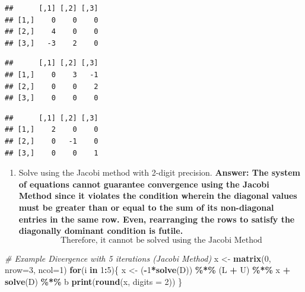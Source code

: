 \documentclass[
]{article}
\newenvironment{Shaded}{\begin{snugshade}}{\end{snugshade}}
\newcommand{\AttributeTok}[1]{\textcolor[rgb]{0.13,0.29,0.53}{#1}}
\newcommand{\CommentTok}[1]{\textcolor[rgb]{0.56,0.35,0.01}{\textit{#1}}}
\newcommand{\ControlFlowTok}[1]{\textcolor[rgb]{0.13,0.29,0.53}{\textbf{#1}}}
\newcommand{\DecValTok}[1]{\textcolor[rgb]{0.00,0.00,0.81}{#1}}
\newcommand{\FunctionTok}[1]{\textcolor[rgb]{0.13,0.29,0.53}{\textbf{#1}}}
\newcommand{\NormalTok}[1]{#1}
\newcommand{\OtherTok}[1]{\textcolor[rgb]{0.56,0.35,0.01}{#1}}
\newcommand{\SpecialCharTok}[1]{\textcolor[rgb]{0.81,0.36,0.00}{\textbf{#1}}}
\providecommand{\tightlist}{%
  \setlength{\itemsep}{0pt}\setlength{\parskip}{0pt}}
\begin{document}
\begin{verbatim}
##      [,1] [,2] [,3]
## [1,]    0    0    0
## [2,]    4    0    0
## [3,]   -3    2    0
\end{verbatim}

\begin{Shaded}
\end{Shaded}

\begin{verbatim}
##      [,1] [,2] [,3]
## [1,]    0    3   -1
## [2,]    0    0    2
## [3,]    0    0    0
\end{verbatim}

\begin{Shaded}
\end{Shaded}

\begin{verbatim}
##      [,1] [,2] [,3]
## [1,]    2    0    0
## [2,]    0   -1    0
## [3,]    0    0    1
\end{verbatim}

\begin{enumerate}
\def\labelenumi{\alph{enumi}.}
\tightlist
\item
  Solve using the Jacobi method with 2-digit precision. \textbf{Answer:
  The system of equations cannot guarantee convergence using the Jacobi
  Method since it violates the condition wherein the diagonal values
  must be greater than or equal to the sum of its non-diagonal entries
  in the same row. Even, rearranging the rows to satisfy the diagonally
  dominant condition is futile.} \[
  \boxed{
  \text{Therefore, it cannot be solved using the Jacobi Method}
  }
  \]
\end{enumerate}

\begin{Shaded}
\begin{Highlighting}[]
\CommentTok{\# Example Divergence with 5 iterations (Jacobi Method)}
\NormalTok{x }\OtherTok{\textless{}{-}} \FunctionTok{matrix}\NormalTok{(}\DecValTok{0}\NormalTok{, }\AttributeTok{nrow=}\DecValTok{3}\NormalTok{, }\AttributeTok{ncol=}\DecValTok{1}\NormalTok{)}
\ControlFlowTok{for}\NormalTok{(i }\ControlFlowTok{in} \DecValTok{1}\SpecialCharTok{:}\DecValTok{5}\NormalTok{)\{}
\NormalTok{  x }\OtherTok{\textless{}{-}}\NormalTok{ (}\SpecialCharTok{{-}}\DecValTok{1}\SpecialCharTok{*}\FunctionTok{solve}\NormalTok{(D)) }\SpecialCharTok{\%*\%}\NormalTok{ (L }\SpecialCharTok{+}\NormalTok{ U) }\SpecialCharTok{\%*\%}\NormalTok{ x }\SpecialCharTok{+} \FunctionTok{solve}\NormalTok{(D) }\SpecialCharTok{\%*\%}\NormalTok{ b}
  \FunctionTok{print}\NormalTok{(}\FunctionTok{round}\NormalTok{(x, }\AttributeTok{digits =} \DecValTok{2}\NormalTok{))}
\NormalTok{\}}
\end{Highlighting}
\end{Shaded}
\end{document}
